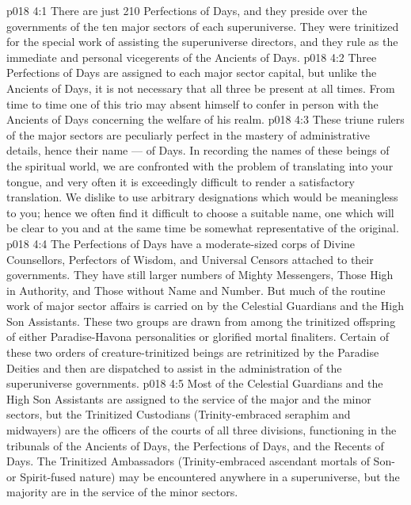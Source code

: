 \vs p018 4:1 There are just 210 Perfections of Days, and they preside over the governments of the ten major sectors of each superuniverse. They were trinitized for the special work of assisting the superuniverse directors, and they rule as the immediate and personal vicegerents of the Ancients of Days.
\vs p018 4:2 Three Perfections of Days are assigned to each major sector capital, but unlike the Ancients of Days, it is not necessary that all three be present at all times. From time to time one of this trio may absent himself to confer in person with the Ancients of Days concerning the welfare of his realm.
\vs p018 4:3 \pc These triune rulers of the major sectors are peculiarly perfect in the mastery of administrative details, hence their name ---  of Days. In recording the names of these beings of the spiritual world, we are confronted with the problem of translating into your tongue, and very often it is exceedingly difficult to render a satisfactory translation. We dislike to use arbitrary designations which would be meaningless to you; hence we often find it difficult to choose a suitable name, one which will be clear to you and at the same time be somewhat representative of the original.
\vs p018 4:4 \pc The Perfections of Days have a moderate\hyp{}sized corps of Divine Counsellors, Perfectors of Wisdom, and Universal Censors attached to their governments. They have still larger numbers of Mighty Messengers, Those High in Authority, and Those without Name and Number. But much of the routine work of major sector affairs is carried on by the Celestial Guardians and the High Son Assistants. These two groups are drawn from among the trinitized offspring of either Paradise\hyp{}Havona personalities or glorified mortal finaliters. Certain of these two orders of creature\hyp{}trinitized beings are retrinitized by the Paradise Deities and then are dispatched to assist in the administration of the superuniverse governments.
\vs p018 4:5 Most of the Celestial Guardians and the High Son Assistants are assigned to the service of the major and the minor sectors, but the Trinitized Custodians (Trinity\hyp{}embraced seraphim and midwayers) are the officers of the courts of all three divisions, functioning in the tribunals of the Ancients of Days, the Perfections of Days, and the Recents of Days. The Trinitized Ambassadors (Trinity\hyp{}embraced ascendant mortals of Son\hyp{} or Spirit\hyp{}fused nature) may be encountered anywhere in a superuniverse, but the majority are in the service of the minor sectors.
